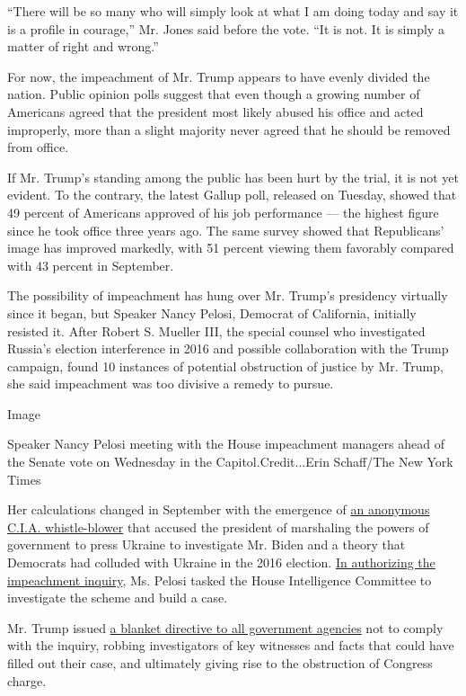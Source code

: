 ``There will be so many who will simply look at what I am doing today
and say it is a profile in courage,'' Mr. Jones said before the vote.
``It is not. It is simply a matter of right and wrong.''

For now, the impeachment of Mr. Trump appears to have evenly divided the
nation. Public opinion polls suggest that even though a growing number
of Americans agreed that the president most likely abused his office and
acted improperly, more than a slight majority never agreed that he
should be removed from office.

If Mr. Trump's standing among the public has been hurt by the trial, it
is not yet evident. To the contrary, the latest Gallup poll, released on
Tuesday, showed that 49 percent of Americans approved of his job
performance --- the highest figure since he took office three years ago.
The same survey showed that Republicans' image has improved markedly,
with 51 percent viewing them favorably compared with 43 percent in
September.

The possibility of impeachment has hung over Mr. Trump's presidency
virtually since it began, but Speaker Nancy Pelosi, Democrat of
California, initially resisted it. After Robert S. Mueller III, the
special counsel who investigated Russia's election interference in 2016
and possible collaboration with the Trump campaign, found 10 instances
of potential obstruction of justice by Mr. Trump, she said impeachment
was too divisive a remedy to pursue.

Image

Speaker Nancy Pelosi meeting with the House impeachment managers ahead
of the Senate vote on Wednesday in the Capitol.Credit...Erin Schaff/The
New York Times

Her calculations changed in September with the emergence of
\href{https://www.nytimes.com/interactive/2019/09/26/us/politics/whistle-blower-complaint.html}{an
anonymous C.I.A. whistle-blower} that accused the president of
marshaling the powers of government to press Ukraine to investigate Mr.
Biden and a theory that Democrats had colluded with Ukraine in the 2016
election.
\href{https://www.nytimes.com/2019/09/24/us/politics/democrats-impeachment-trump.html}{In
authorizing the impeachment inquiry}, Ms. Pelosi tasked the House
Intelligence Committee to investigate the scheme and build a case.

Mr. Trump issued
\href{https://www.nytimes.com/2019/10/08/us/politics/sondland-trump-ukraine-impeach.html}{a
blanket directive to all government agencies} not to comply with the
inquiry, robbing investigators of key witnesses and facts that could
have filled out their case, and ultimately giving rise to the
obstruction of Congress charge.

